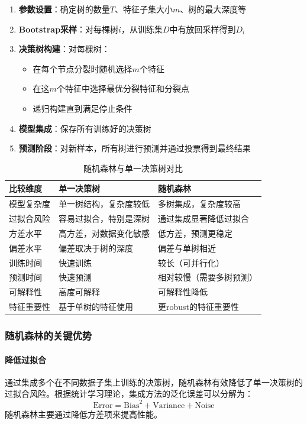 \documentclass[UTF8]{report}
\theoremstyle{MyLineTheoremStyle} %
\theoremstyle{MyBlockTheoremStyle} %
\theoremstyle{MySubsubsectionStyle} %
\begin{document}
\begin{enumerate}[label=\arabic*.]
    \item \textbf{参数设置}：确定树的数量$T$、特征子集大小$m$、树的最大深度等
    \item \textbf{Bootstrap采样}：对每棵树$i$，从训练集$D$中有放回采样得到$D_i$
    \item \textbf{决策树构建}：对每棵树：
        \begin{itemize}
            \item 在每个节点分裂时随机选择$m$个特征
            \item 在这$m$个特征中选择最优分裂特征和分裂点
            \item 递归构建直到满足停止条件
        \end{itemize}
    \item \textbf{模型集成}：保存所有训练好的决策树
    \item \textbf{预测阶段}：对新样本，所有树进行预测并通过投票得到最终结果
\end{enumerate}

\begin{table}[h]
\centering
\caption{随机森林与单一决策树对比}
\begin{tabular}{l p{4cm} p{4cm}}
\toprule
\textbf{比较维度} & \textbf{单一决策树} & \textbf{随机森林} \\
\midrule
模型复杂度 & 单一树结构，复杂度较低 & 多树集成，复杂度较高 \\
过拟合风险 & 容易过拟合，特别是深树 & 通过集成显著降低过拟合 \\
方差水平 & 高方差，对数据变化敏感 & 低方差，预测更稳定 \\
偏差水平 & 偏差取决于树的深度 & 偏差与单树相近 \\
训练时间 & 快速训练 & 较长（可并行化） \\
预测时间 & 快速预测 & 相对较慢（需要多树预测） \\
可解释性 & 高度可解释 & 可解释性降低 \\
特征重要性 & 基于单树的特征使用 & 更robust的特征重要性 \\
\bottomrule
\end{tabular}
\end{table}

\subsubsection{随机森林的关键优势}

\paragraph{降低过拟合}
通过集成多个在不同数据子集上训练的决策树，随机森林有效降低了单一决策树的过拟合风险。根据统计学习理论，集成方法的泛化误差可以分解为：
\begin{equation}
\text{Error} = \text{Bias}^2 + \text{Variance} + \text{Noise}
\end{equation}
随机森林主要通过降低方差项来提高性能。
\end{document}
